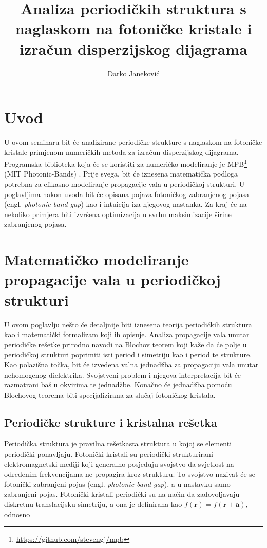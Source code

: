 \documentclass[utf8, seminar, numeric]{fer}
\begin{document}
\title{Analiza periodičkih struktura s naglaskom na fotoničke kristale
	   i izračun disperzijskog dijagrama}
\author{Darko Janeković}

\maketitle

\tableofcontents


\chapter{Uvod}
U ovom seminaru bit će analizirane periodičke strukture s naglaskom na fotoničke
kristale primjenom numeričkih metoda za izračun disperzijskog dijagrama.
Programska biblioteka koja će se koristiti za numeričko modeliranje je
MPB\footnote{\url{https://github.com/stevengj/mpb}} (MIT Photonic-Bands)
\cite{Johnson2001:mpb}. Prije svega, bit će iznesena
matematička podloga potrebna za efikasno modeliranje propagacije vala u
periodičkoj strukturi. U poglavljima nakon uvoda bit će opisana pojava fotoničkog
zabranjenog pojasa (engl. \textit{photonic band-gap}) kao i intuicija iza
njegovog nastanka. Za kraj će na nekoliko primjera biti izvršena optimizacija u
svrhu maksimizacije širine zabranjenog pojasa.


\chapter{Matematičko modeliranje propagacije vala u periodičkoj strukturi}

U ovom poglavlju nešto će detaljnije biti iznesena teorija periodičkih struktura
kao i matematički formalizam koji ih opisuje. Analiza propagacije vala unutar
periodičke rešetke prirodno navodi na Blochov teorem koji kaže da će polje u
periodičkoj strukturi poprimiti isti period i simetriju kao i period te strukture.
Kao polazišna točka, bit će izvedena valna jednadžba za propagaciju vala unutar
nehomogenog dielektrika. Svojstveni problem i njegova interpretacija bit će
razmatrani baš u okvirima te jednadžbe. Konačno će jednadžba pomoću Blochovog
teorema biti specijalizirana za slučaj fotoničkog kristala.


\section{Periodičke strukture i kristalna rešetka}

Periodička struktura je pravilna rešetkasta struktura u kojoj se elementi
periodički ponavljaju. Fotonički kristali su periodički strukturirani
elektromagnetski mediji koji generalno posjeduju svojstvo da svjetlost na
određenim frekvencijama ne propagira kroz strukturu. To svojstvo nazivat će se
fotonički zabranjeni pojas (engl. \textit{photonic band-gap}), a u nastavku
samo zabranjeni pojas. Fotonički kristali periodički su na način da
zadovoljavaju diskretnu translacijsku simetriju, a ona je definirana kao
${f(\mathbf{r}) = f(\mathbf{r} \pm \mathbf{a})}$, odnosno
\end{document}
